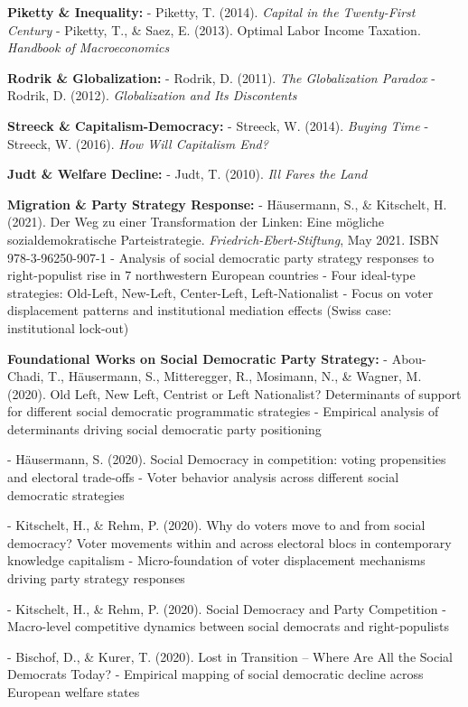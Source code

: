 \textbf{Piketty \& Inequality:}
- Piketty, T. (2014). \emph{Capital in the Twenty-First Century}
- Piketty, T., \& Saez, E. (2013). Optimal Labor Income Taxation. \emph{Handbook of Macroeconomics}

\textbf{Rodrik \& Globalization:}
- Rodrik, D. (2011). \emph{The Globalization Paradox}
- Rodrik, D. (2012). \emph{Globalization and Its Discontents}

\textbf{Streeck \& Capitalism-Democracy:}
- Streeck, W. (2014). \emph{Buying Time}
- Streeck, W. (2016). \emph{How Will Capitalism End?}

\textbf{Judt \& Welfare Decline:}
- Judt, T. (2010). \emph{Ill Fares the Land}

\textbf{Migration \& Party Strategy Response:}
- Häusermann, S., \& Kitschelt, H. (2021). Der Weg zu einer Transformation der Linken: Eine mögliche sozialdemokratische Parteistrategie. \emph{Friedrich-Ebert-Stiftung}, May 2021. ISBN 978-3-96250-907-1
  - Analysis of social democratic party strategy responses to right-populist rise in 7 northwestern European countries
  - Four ideal-type strategies: Old-Left, New-Left, Center-Left, Left-Nationalist
  - Focus on voter displacement patterns and institutional mediation effects (Swiss case: institutional lock-out)

\textbf{Foundational Works on Social Democratic Party Strategy:}
- Abou-Chadi, T., Häusermann, S., Mitteregger, R., Mosimann, N., \& Wagner, M. (2020). Old Left, New Left, Centrist or Left Nationalist? Determinants of support for different social democratic programmatic strategies
  - Empirical analysis of determinants driving social democratic party positioning

- Häusermann, S. (2020). Social Democracy in competition: voting propensities and electoral trade-offs
  - Voter behavior analysis across different social democratic strategies

- Kitschelt, H., \& Rehm, P. (2020). Why do voters move to and from social democracy? Voter movements within and across electoral blocs in contemporary knowledge capitalism
  - Micro-foundation of voter displacement mechanisms driving party strategy responses

- Kitschelt, H., \& Rehm, P. (2020). Social Democracy and Party Competition
  - Macro-level competitive dynamics between social democrats and right-populists

- Bischof, D., \& Kurer, T. (2020). Lost in Transition – Where Are All the Social Democrats Today?
  - Empirical mapping of social democratic decline across European welfare states

